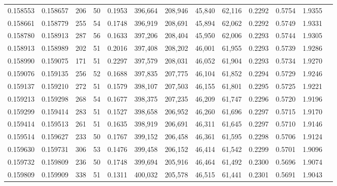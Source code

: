 \begin{tabular}{rrrrrrrrrrrrr}
0.158553 & 0.158657 &   206 &  50 &                                     0.1953 & 396,664 & 208,946 &  45,840 &  62,116 & 0.2292 & 0.5754 & 1.9355 \\
0.158661 & 0.158779 &   255 &  54 &                                     0.1748 & 396,919 & 208,691 &  45,894 &  62,062 & 0.2292 & 0.5749 & 1.9331 \\
0.158780 & 0.158913 &   287 &  56 &                                     0.1633 & 397,206 & 208,404 &  45,950 &  62,006 & 0.2293 & 0.5744 & 1.9305 \\
0.158913 & 0.158989 &   202 &  51 &                                     0.2016 & 397,408 & 208,202 &  46,001 &  61,955 & 0.2293 & 0.5739 & 1.9286 \\
0.158990 & 0.159075 &   171 &  51 &                                     0.2297 & 397,579 & 208,031 &  46,052 &  61,904 & 0.2293 & 0.5734 & 1.9270 \\
0.159076 & 0.159135 &   256 &  52 &                                     0.1688 & 397,835 & 207,775 &  46,104 &  61,852 & 0.2294 & 0.5729 & 1.9246 \\
0.159137 & 0.159210 &   272 &  51 &                                     0.1579 & 398,107 & 207,503 &  46,155 &  61,801 & 0.2295 & 0.5725 & 1.9221 \\
0.159213 & 0.159298 &   268 &  54 &                                     0.1677 & 398,375 & 207,235 &  46,209 &  61,747 & 0.2296 & 0.5720 & 1.9196 \\
0.159299 & 0.159414 &   283 &  51 &                                     0.1527 & 398,658 & 206,952 &  46,260 &  61,696 & 0.2297 & 0.5715 & 1.9170 \\
0.159414 & 0.159513 &   261 &  51 &                                     0.1635 & 398,919 & 206,691 &  46,311 &  61,645 & 0.2297 & 0.5710 & 1.9146 \\
0.159514 & 0.159627 &   233 &  50 &                                     0.1767 & 399,152 & 206,458 &  46,361 &  61,595 & 0.2298 & 0.5706 & 1.9124 \\
0.159630 & 0.159731 &   306 &  53 &                                     0.1476 & 399,458 & 206,152 &  46,414 &  61,542 & 0.2299 & 0.5701 & 1.9096 \\
0.159732 & 0.159809 &   236 &  50 &                                     0.1748 & 399,694 & 205,916 &  46,464 &  61,492 & 0.2300 & 0.5696 & 1.9074 \\
0.159809 & 0.159909 &   338 &  51 &                                     0.1311 & 400,032 & 205,578 &  46,515 &  61,441 & 0.2301 & 0.5691 & 1.9043 \\

\end{tabular}
